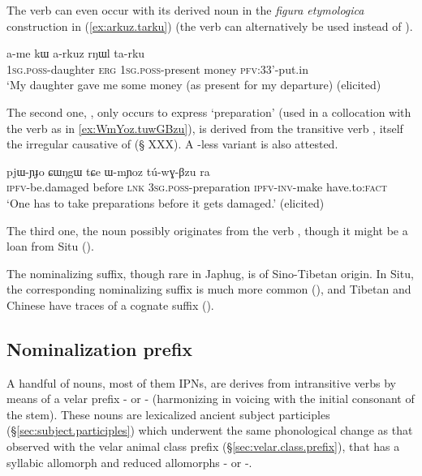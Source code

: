 The verb  can even occur with its derived noun  in the \textit{figura etymologica} construction in (\ref{ex:arkuz.tarku}) (the verb  can alternatively be used instead of ).

\begin{exe}
\ex \label{ex:arkuz.tarku}
\gll a-me kɯ a-rkuz rŋɯl ta-rku \\
\textsc{1sg}.\textsc{poss}-daughter \textsc{erg} \textsc{1sg}.\textsc{poss}-present money \textsc{pfv}:3\fl{}3'-put.in \\
\glt `My daughter gave me some money (as present for my departure) (elicited)
\end{exe}

The second one, , only occurs to express `preparation' (used in a collocation with the verb  as in \ref{ex:WmYoz.tuwGBzu}), is derived from the transitive verb , itself the irregular causative of  (§ XXX). A -less variant  is also attested.

\begin{exe}
\ex \label{ex:WmYoz.tuwGBzu}
\gll  pjɯ-ɲɟo ɕɯŋgɯ tɕe ɯ-mɲoz tú-wɣ-βzu ra \\
\textsc{ipfv}-be.damaged before \textsc{lnk} \textsc{3sg}.\textsc{poss}-preparation \textsc{ipfv}-\textsc{inv}-make have.to:\textsc{fact} \\
\glt `One has to take preparations before it gets damaged.' (elicited)
\end{exe}

The third one, the noun  possibly originates from the verb , though it might be a loan from Situ (\citealt{jacques03s.houzhui}). 

The  nominalizing suffix, though rare in Japhug, is of Sino-Tibetan origin. In Situ, the corresponding nominalizing  suffix is much more common (\citealt{jacques03s.houzhui}), and Tibetan and Chinese have traces of a cognate suffix (\citealt{jacques16ssuffixes}).


\subsection{Nominalization  prefix} \label{sec:G.nmlz}
A handful of nouns, most of them IPNs, are derives from intransitive verbs by means of a velar prefix  - or - (harmonizing in voicing with the initial consonant of the stem). These nouns are lexicalized ancient subject participles (§\ref{sec:subject.participles}) which underwent the same phonological change as that observed with the velar animal class prefix (§\ref{sec:velar.class.prefix}), that has a syllabic allomorph  and reduced allomorphs - or -. 

